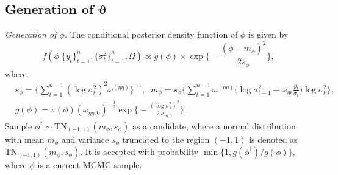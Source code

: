 \documentclass[11pt]{article}
\begin{document}
\subsection{Generation of $\bm{\vartheta}$}
\noindent
{\it Generation of $\phi$.} 
The conditional posterior density function of $\phi$ is given by 
\begin{equation}
f(\phi |\{y_t\}_{t=1}^n, \{\sigma^2_t\}_{t=1}^n, \Omega) 
\propto g(\phi) \times\exp\bigg\{ -\frac{(\phi -m_\phi)^2}{2s_\phi} \bigg\}, 
\end{equation}
where
\begin{align}
&s_\phi = \Bigg\{\sum_{t=1}^{n-1} (\log\sigma^2_t)^2 \omega^{(\eta\eta)} \Bigg\}^{-1}, \;\;
m_\phi = s_\phi \Bigg\{\sum_{t=1}^{n-1} \omega^{(\eta\eta)}\bigg(\log\sigma^2_{t+1} -\omega_{\eta\epsilon}\frac{y_t}{\sigma_t}\bigg) \log\sigma^2_t \Bigg\}, \\
&g(\phi) = \pi(\phi) (\omega_{\eta\eta, 0})^{-\frac{1}{2}} \exp\bigg\{ -\frac{(\log\sigma^2_1)^2}{2\omega_{\eta\eta, 0}} \bigg\}. 
\end{align}
Sample $\phi^\dagger\sim\mathrm{TN}_{(-1,1)}(m_\phi, s_\phi)$ as a candidate, where a normal distribution with mean $m_\phi$ and variance $s_\phi$ truncated to the region $(-1, 1)$ is denoted as $\mathrm{TN}_{(-1,1)}(m_\phi, s_\phi)$. 
It is accepted with probability $\min\{1, g(\phi^\dagger)/g(\phi)\}$, where $\phi$ is a current MCMC sample. 


\vspace{0.5\baselineskip}
\end{document}
